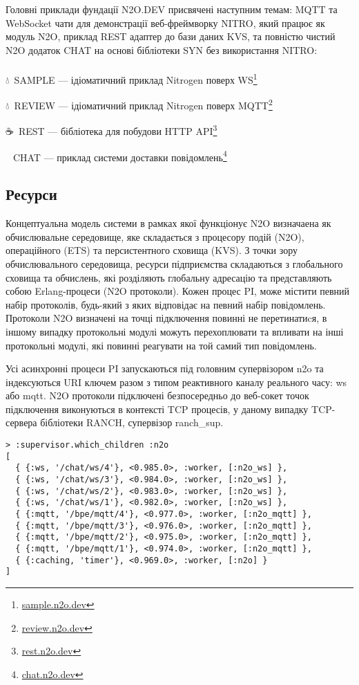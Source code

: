 Головні приклади фундації N2O.DEV присвячені наступним темам: MQTT та WebSocket
чати для демонстрації веб-фреймворку NITRO, який працює як модуль N2O, приклад
REST адаптер до бази даних KVS, та повністю чистий N2O додаток CHAT на основі
бібліотеки SYN без використання NITRO:\\
\\ \indent
\setmainfont{Segoe UI Emoji}💧\setmainfont{Geometria}\ SAMPLE --- ідіоматичний приклад Nitrogen поверх WS\footnote{\url{sample.n2o.dev}}

\setmainfont{Segoe UI Emoji}💧\setmainfont{Geometria}\ REVIEW --- ідіоматичний приклад Nitrogen поверх MQTT\footnote{\url{review.n2o.dev}}

\setmainfont{Segoe UI Emoji}☕\setmainfont{Geometria}\ REST --- бібліотека для побудови HTTP API\footnote{\url{rest.n2o.dev}}

\setmainfont{Segoe UI Emoji}💬\setmainfont{Geometria}\ CHAT --- приклад системи доставки повідомлень\footnote{\url{chat.n2o.dev}}



\newpage
\subsection{Ресурси}

Концептуальна модель системи в рамках якої функціонує N2O визначаена як обчислювальне середовище,
яке складається з процесору подій (N2O), операційного (ETS) та персистентного сховища (KVS).
З точки зору обчислювального середовища, ресурси підприємства складаються з глобального
 сховища та обчислень, які розділяють глобальну адресацію та представляють собою
Erlang-процеси (N2O протоколи). Кожен процес PI, може містити певний набір протоколів,
будь-який з яких відповідає на певний набір повідомлень. Протоколи N2O визначені на
точці підключення повинні не перетинатиcя, в іншому випадку протокольні модулі можуть
перехоплювати та впливати на інші протокольні модулі, які повинні реагувати на той
самий тип повідомлень.

Усі асинхронні процеси PI запускаються під головним супервізором n2o та індексуються
URI ключем разом з типом реактивного каналу реального часу: ws або mqtt. N2O протоколи
підключені безпосередньо до веб-сокет точок підключення виконуються в контексті TCP
процесів, у даному випадку TCP-сервера бібліотеки RANCH, супервізор ranch_sup.

\begin{lstlisting}
> :supervisor.which_children :n2o
[
  { {:ws, '/chat/ws/4'}, <0.985.0>, :worker, [:n2o_ws] },
  { {:ws, '/chat/ws/3'}, <0.984.0>, :worker, [:n2o_ws] },
  { {:ws, '/chat/ws/2'}, <0.983.0>, :worker, [:n2o_ws] },
  { {:ws, '/chat/ws/1'}, <0.982.0>, :worker, [:n2o_ws] },
  { {:mqtt, '/bpe/mqtt/4'}, <0.977.0>, :worker, [:n2o_mqtt] },
  { {:mqtt, '/bpe/mqtt/3'}, <0.976.0>, :worker, [:n2o_mqtt] },
  { {:mqtt, '/bpe/mqtt/2'}, <0.975.0>, :worker, [:n2o_mqtt] },
  { {:mqtt, '/bpe/mqtt/1'}, <0.974.0>, :worker, [:n2o_mqtt] },
  { {:caching, 'timer'}, <0.969.0>, :worker, [:n2o] }
]
\end{lstlisting}

